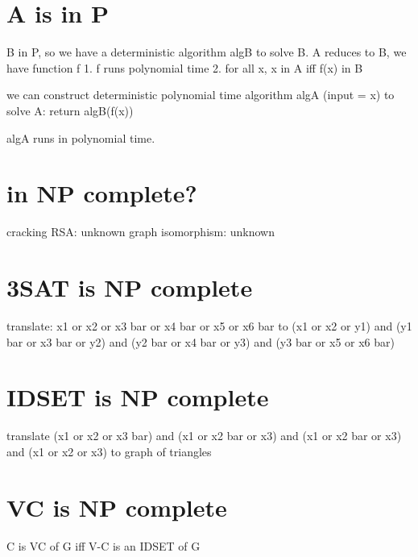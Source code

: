 \documentclass{article}
\begin{document}
\section{A is in P}
B in P, so we have a deterministic algorithm algB to solve B.
A reduces to B, we have function f
1. f runs polynomial time
2. for all x, x in A iff f(x) in B

we can construct deterministic polynomial time algorithm algA (input = x) to solve A:
return algB(f(x))

algA runs in polynomial time.

\section{in NP complete?}
cracking RSA: unknown
graph isomorphism: unknown

\section{3SAT is NP complete}
translate: x1 or x2 or x3 bar or x4 bar or x5 or x6 bar to (x1 or x2 or y1) and 
(y1 bar or x3 bar or y2) and (y2 bar or x4 bar or y3) and (y3 bar or x5 or x6 
bar)

\section{IDSET is NP complete}
translate (x1 or x2 or x3 bar) and (x1 or x2 bar or x3) and (x1 or x2 bar or 
x3) and (x1 or x2 or x3) to graph of triangles

\section{VC is NP complete}
C is VC of G iff V-C is an IDSET of G
\end{document}
